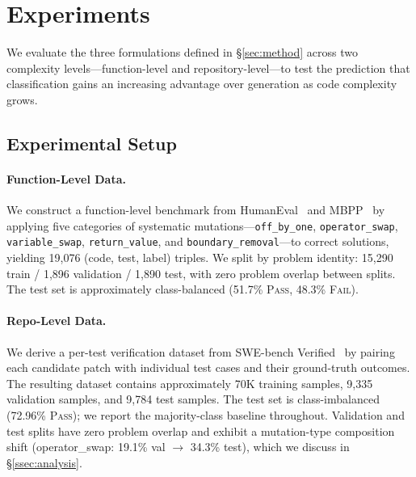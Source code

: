 
\section{Experiments}
\label{sec:experiments}

We evaluate the three formulations defined in \S\ref{sec:method} across two complexity levels---function-level and repository-level---to test the prediction that classification gains an increasing advantage over generation as code complexity grows.

\subsection{Experimental Setup}
\label{ssec:setup}

\paragraph{Function-Level Data.}
We construct a function-level benchmark from HumanEval~\citep{chen2021humaneval} and MBPP~\citep{austin2021mbpp} by applying five categories of systematic mutations---\texttt{off\_by\_one}, \texttt{operator\_swap}, \texttt{variable\_swap}, \texttt{return\_value}, and \texttt{boundary\_removal}---to correct solutions, yielding 19,076 (code, test, label) triples.
We split by problem identity: 15,290 train / 1,896 validation / 1,890 test, with zero problem overlap between splits.
The test set is approximately class-balanced (51.7\% \textsc{Pass}, 48.3\% \textsc{Fail}).

\paragraph{Repo-Level Data.}
We derive a per-test verification dataset from SWE-bench Verified~\citep{jimenez2024swebench} by pairing each candidate patch with individual test cases and their ground-truth outcomes.
The resulting dataset contains approximately 70K training samples, 9,335 validation samples, and 9,784 test samples.
The test set is class-imbalanced (72.96\% \textsc{Pass}); we report the majority-class baseline throughout.
Validation and test splits have zero problem overlap and exhibit a mutation-type composition shift (operator\_swap: 19.1\% val $\to$ 34.3\% test), which we discuss in \S\ref{ssec:analysis}.

